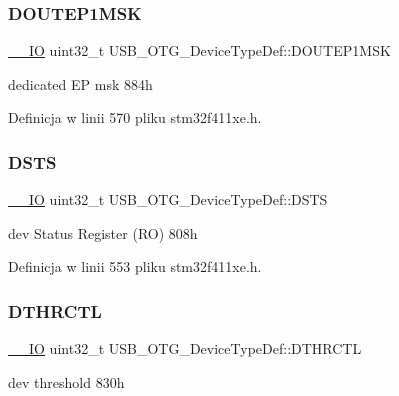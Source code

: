 \subsubsection{\texorpdfstring{D\+O\+U\+T\+E\+P1\+M\+SK}{DOUTEP1MSK}}
{\footnotesize\ttfamily \hyperlink{core__sc300_8h_aec43007d9998a0a0e01faede4133d6be}{\+\_\+\+\_\+\+IO} uint32\+\_\+t U\+S\+B\+\_\+\+O\+T\+G\+\_\+\+Device\+Type\+Def\+::\+D\+O\+U\+T\+E\+P1\+M\+SK}

dedicated EP msk 884h 

Definicja w linii 570 pliku stm32f411xe.\+h.

\mbox{\label{struct_u_s_b___o_t_g___device_type_def_a203b4c02e7f98d9be696b84f2f118263}} 
\subsubsection{\texorpdfstring{D\+S\+TS}{DSTS}}
{\footnotesize\ttfamily \hyperlink{core__sc300_8h_aec43007d9998a0a0e01faede4133d6be}{\+\_\+\+\_\+\+IO} uint32\+\_\+t U\+S\+B\+\_\+\+O\+T\+G\+\_\+\+Device\+Type\+Def\+::\+D\+S\+TS}

dev Status Register (RO) 808h 

Definicja w linii 553 pliku stm32f411xe.\+h.

\mbox{\label{struct_u_s_b___o_t_g___device_type_def_af0a7a07413a095432031eddc900031cd}} 
\subsubsection{\texorpdfstring{D\+T\+H\+R\+C\+TL}{DTHRCTL}}
{\footnotesize\ttfamily \hyperlink{core__sc300_8h_aec43007d9998a0a0e01faede4133d6be}{\+\_\+\+\_\+\+IO} uint32\+\_\+t U\+S\+B\+\_\+\+O\+T\+G\+\_\+\+Device\+Type\+Def\+::\+D\+T\+H\+R\+C\+TL}

dev threshold 830h 

